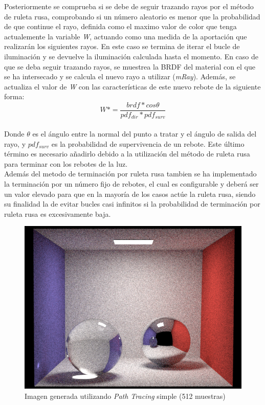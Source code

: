 \documentclass[10pt,oneside,a4paper]{article}
\begin{document}
Posteriormente se comprueba si se debe de seguir trazando rayos por el método de ruleta rusa, comprobando si un número aleatorio es menor que la probabilidad de que continue el rayo, definida como el maximo valor de color que tenga actualemente la variable \textit{W}, actuando como una medida de la aportación que realizarán los siguientes rayos. En este caso se termina de iterar el bucle de iluminación y se devuelve la iluminación calculada hasta el momento. En caso de que se deba seguir trazando rayos, se muestrea la BRDF del material con el que se ha intersecado y se calcula el nuevo rayo a utilizar (\textit{mRay}). Además, se actualiza el valor de \textit{W} con las características de este nuevo rebote de la siguiente forma:
$$W *= \frac{brdf * cos\theta}{pdf_{dir} * pdf_{surv}}$$\\

Donde $\theta$ es el ángulo entre la normal del punto a tratar y el ángulo de salida del rayo, y $pdf_{surv}$ es la probabilidad de supervivencia de un rebote. Este último término es necesario añadirlo debido a la utilización del método de ruleta rusa para terminar con los rebotes de la luz.\\

Además del metodo de terminación por ruleta rusa tambien se ha implementado la terminación por un número fijo de rebotes, el cual es configurable y deberá ser un valor elevado para que en la mayoría de los casos actúe la ruleta rusa, siendo su finalidad la de evitar bucles casi infinitos si la probabilidad de terminación por ruleta rusa es excesivamente baja.\\

\begin{figure}[h]
\centering
\includegraphics[width=.6\linewidth]{images/cbox_path_512.png}
\caption{Imagen generada utilizando \textit{Path Tracing} simple (512 muestras)}
\label{fig:disp}
\end{figure}
\end{document}
